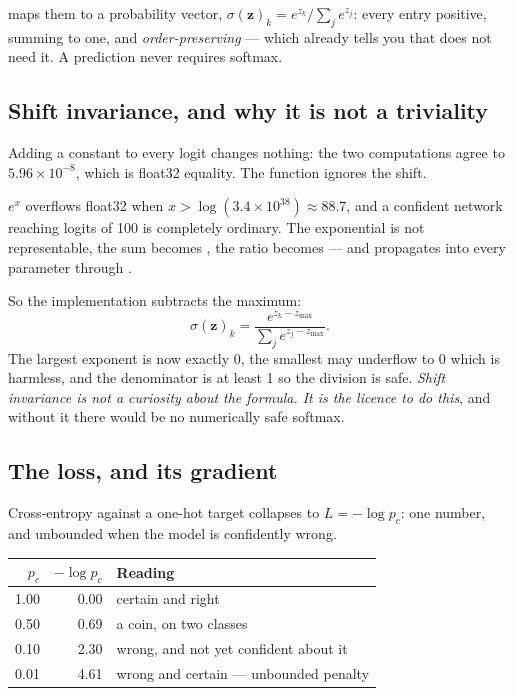 \documentclass[11pt,a4paper]{article}
\begin{document}
 maps them to a probability vector,
$\sigma(\mathbf{z})_k = e^{z_k}/\sum_j e^{z_j}$: every entry positive, summing
to one, and \emph{order-preserving} --- which already tells you that
 does not need it. A prediction never requires softmax.

\subsection{Shift invariance, and why it is not a triviality}

Adding a constant to every logit changes nothing: the two computations agree to
$5.96\times10^{-8}$, which is float32 equality. The function ignores the shift.

\begin{failbox}[title={Failure condition --- float32 does not}]
$e^x$ overflows float32 when $x > \log(3.4\times10^{38}) \approx 88.7$, and a
confident network reaching logits of 100 is completely ordinary. The
exponential is not representable, the sum becomes , the ratio becomes
 --- and  propagates into every parameter through
.
\end{failbox}

So the implementation subtracts the maximum:
\[ \sigma(\mathbf{z})_k = \frac{e^{z_k - z_{\max}}}{\sum_j e^{z_j - z_{\max}}}. \]
The largest exponent is now exactly 0, the smallest may underflow to 0 which is
harmless, and the denominator is at least 1 so the division is safe.
\emph{Shift invariance is not a curiosity about the formula. It is the licence
to do this}, and without it there would be no numerically safe softmax.

\subsection{The loss, and its gradient}

Cross-entropy against a one-hot target collapses to $L = -\log p_c$: one
number, and unbounded when the model is confidently wrong.

\begin{center}
\small
\begin{tabular}{rrl}
\toprule
$p_c$ & $-\log p_c$ & \textbf{Reading} \\
\midrule
1.00 & 0.00 & certain and right \\
0.50 & 0.69 & a coin, on two classes \\
0.10 & 2.30 & wrong, and not yet confident about it \\
0.01 & 4.61 & wrong and certain --- unbounded penalty \\
\bottomrule
\end{tabular}
\end{center}
\end{document}
